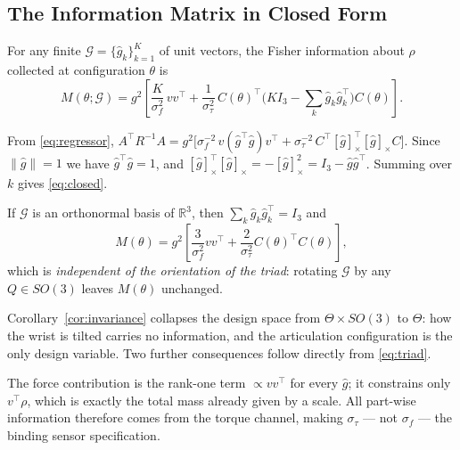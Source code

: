 \subsection{The Information Matrix in Closed Form}
\label{sec:lemma}

\begin{lemma}
\label{lem:closed}
For any finite $\mathcal{G}=\{\hat g_k\}_{k=1}^{K}$ of unit vectors, the Fisher
information about $\rho$ collected at configuration $\theta$ is
%
\begin{equation}
M(\theta;\mathcal{G})
= g^2\!\left[\frac{K}{\sigma_f^2}\,v v^{\!\top}
+\frac{1}{\sigma_\tau^2}\,C(\theta)^{\!\top}
\Big(K I_3-\!\sum_k \hat g_k\hat g_k^{\!\top}\Big) C(\theta)\right].
\label{eq:closed}
\end{equation}
\end{lemma}

\begin{IEEEproof}
From \eqref{eq:regressor},
$A^{\!\top}\!R^{-1}A
= g^2\big[\sigma_f^{-2}\,v(\hat g^{\!\top}\hat g)v^{\!\top}
+\sigma_\tau^{-2}\,C^{\!\top}[\hat g]_\times^{\!\top}[\hat g]_\times C\big]$.
Since $\|\hat g\|=1$ we have $\hat g^{\!\top}\hat g=1$, and
$[\hat g]_\times^{\!\top}[\hat g]_\times=-[\hat g]_\times^2
=I_3-\hat g\hat g^{\!\top}$. Summing over $k$ gives \eqref{eq:closed}.
\end{IEEEproof}

\begin{corollary}
\label{cor:invariance}
If $\mathcal{G}$ is an orthonormal basis of $\mathbb{R}^3$, then
$\sum_k\hat g_k\hat g_k^{\!\top}=I_3$ and
%
\begin{equation}
M(\theta)=g^2\!\left[\frac{3}{\sigma_f^2}v v^{\!\top}
+\frac{2}{\sigma_\tau^2}C(\theta)^{\!\top}C(\theta)\right],
\label{eq:triad}
\end{equation}
%
which is \emph{independent of the orientation of the triad}: rotating
$\mathcal{G}$ by any $Q\in SO(3)$ leaves $M(\theta)$ unchanged.
\end{corollary}

Corollary~\ref{cor:invariance} collapses the design space from
$\Theta\times SO(3)$ to $\Theta$: how the wrist is tilted carries no
information, and the articulation configuration is the only design variable.
Two further consequences follow directly from \eqref{eq:triad}.

\begin{remark}
\label{rem:force}
The force contribution is the rank-one term $\propto v v^{\!\top}$ for every
$\hat g$; it constrains only $v^{\!\top}\!\rho$, which is exactly the total mass
already given by a scale. All part-wise information therefore comes from the
torque channel, making $\sigma_\tau$ --- not $\sigma_f$ --- the binding sensor
specification.
\end{remark}

